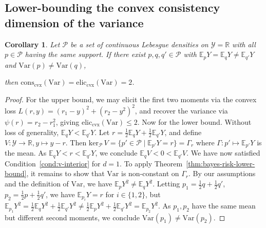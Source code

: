 \documentclass{article} %
\newcommand{\Comments}{0}
\newcommand{\mytodo}[2]{\ifnum\Comments=1%
	\todo[linecolor=#1!80!black,backgroundcolor=#1,bordercolor=#1!80!black]{#2}\fi}
\newcommand{\jessiet}[1]{\mytodo{teal!20!white}{JF: #1}}
\newcommand{\btw}[1]{}%
\newcommand{\reals}{\mathbb{R}}
\newcommand{\eliccvx}{\mathrm{elic}_\mathrm{cvx}}
\newcommand{\conscvx}{\mathrm{cons}_\mathrm{cvx}}
\newcommand{\zeros}[1]{\mathrm{ker}_\P\,#1}
\newcommand{\E}{\mathbb{E}}
\renewcommand{\P}{\mathcal{P}}
\newcommand{\Y}{\mathcal{Y}}
\newcommand{\Var}{\mathrm{Var}}
\newtheorem{corollary}{Corollary}
\begin{document}



\subsection{Lower-bounding the convex consistency dimension of the variance}\label{app:variance}
\begin{corollary}
	\label{cor:variance}
	Let $\P$ be a set of continuous Lebesgue densities on $\Y=\reals$ with all $p \in \P$ having the same support.
	If there exist $p,q,q'\in\P$ with $\E_p Y = \E_q Y \neq \E_{q'} Y$ and $\Var(p) \neq \Var(q)$,
	\btw{Raf: I think this condition is tight actually: if there is no such triple in $\P$, I think $\eliccvx(\Var) \leq 1$ (i.e., $\Var$ is constant or a function of the mean)}
	then $\conscvx(\Var)=\eliccvx(\Var)=2$.
\end{corollary}
\begin{proof}
	For the upper bound, we may elicit the first two moments via the convex loss $L(r,y) = (r_1-y)^2 + (r_2-y^2)^2$, and recover the variance via $\psi(r) = r_2-r_1^2$, giving $\eliccvx(\Var) \leq 2$.
	Now for the lower bound.
	Without loss of generality, $\E_qY < \E_{q'}Y$.
	Let $r = \tfrac 1 2 \E_qY + \tfrac 1 2 \E_{q'}Y$, and define $V:\Y\to\reals, y\mapsto y-r$.
	Then $\zeros{V} = \{p'\in\P \mid \E_{p'}Y=r\} = \Gamma_r$ where $\Gamma:p'\mapsto \E_{p'}Y$ is the mean.
	As $\E_q Y < r < \E_{q'} Y$, we conclude $\E_q V < 0 < \E_{q'} V$.
	We have now satisfied Condition~\ref{cond:v-interior} for $d=1$.
	To apply Theorem~\ref{thm:bayes-risk-lower-bound}, it remains to show that $\Var$ is non-constant on $\Gamma_r$.
	By our assumptions and the definition of $\Var$, we have $\E_p Y^2 \neq \E_q Y^2$.
	Letting $p_1 = \tfrac 1 2 q + \tfrac 1 2 q'$, $p_2 = \tfrac 1 2 p + \tfrac 1 2 q'$, we have $\E_{p_i}Y = r$ for $i\in\{1,2\}$, but $\E_{p_1} Y^2 = \tfrac 1 2 \E_qY^2 + \tfrac 1 2 \E_{q'}Y^2 \neq \tfrac 1 2 \E_pY^2 + \tfrac 1 2 \E_{q'}Y^2 = \E_{p_2}Y^2$.
	As $p_1,p_2$ have the same mean but different second moments, we conclude $\Var(p_1) \neq \Var(p_2)$.
\end{proof}
\end{document}
